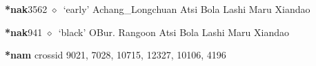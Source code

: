 \begin{list}{}{\leftmargin=1.5em \itemindent=-1.5em}
  \item {\footnotesize \textbf{*nak}}{\tiny 3562}
\hspace{1ex}
         $\diamond$~`early'
         Achang\_Longchuan 
\hspace{1ex}
         Atsi 
\hspace{1ex}
         Bola 
\hspace{1ex}
         Lashi 
\hspace{1ex}
         Maru 
\hspace{1ex}
         Xiandao 
  \item {\footnotesize \textbf{*nak}}{\tiny 941}
\hspace{1ex}
         $\diamond$~`black'
         OBur. 
\hspace{1ex}
         Rangoon 
\hspace{1ex}
         Atsi 
\hspace{1ex}
         Bola 
\hspace{1ex}
         Lashi 
\hspace{1ex}
         Maru 
\hspace{1ex}
         Xiandao 
  \end{list}
\item
\textbf{*nam}
  {\tiny crossid 9021, 7028, 10715, 12327, 10106, 4196}
